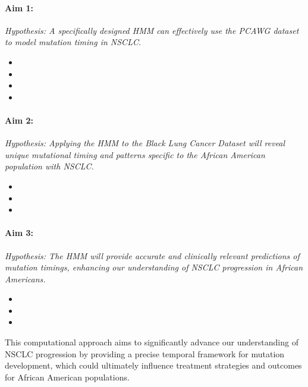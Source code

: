 \paragraph*{Aim 1: \SpecificAimOne} \emph{Hypothesis: A specifically designed HMM can effectively use the PCAWG dataset to model mutation timing in NSCLC.}

\begin{itemize}[noitemsep]
    \item \SpecificAimOneA
    \item \SpecificAimOneB
    \item \SpecificAimOneC
    \item \SpecificAimOneD
\end{itemize}

\paragraph*{Aim 2: \SpecificAimTwo} \emph{Hypothesis: Applying the HMM to the Black Lung Cancer Dataset will reveal unique mutational timing and patterns specific to the African American population with NSCLC.}

\begin{itemize}[noitemsep]
    \item \SpecificAimTwoA
    \item \SpecificAimTwoB
    \item \SpecificAimTwoC
\end{itemize}

\paragraph*{Aim 3: \SpecificAimThree} \emph{Hypothesis: The HMM will provide accurate and clinically relevant predictions of mutation timings, enhancing our understanding of NSCLC progression in African Americans.}

\begin{itemize}[noitemsep]
    \item \SpecificAimThreeA
    \item \SpecificAimThreeB
    \item \SpecificAimThreeC
\end{itemize}

This computational approach aims to significantly advance our understanding of NSCLC progression by providing a precise temporal framework for mutation development, which could ultimately influence treatment strategies and outcomes for African American populations.




